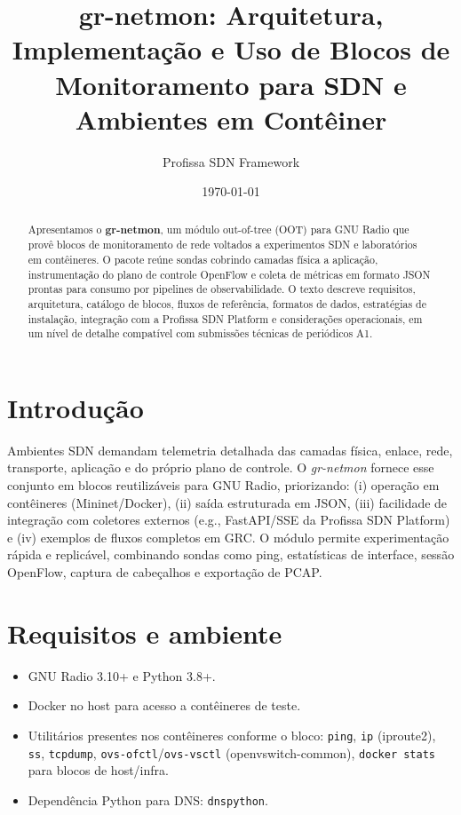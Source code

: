 \documentclass[11pt,a4paper]{article}
\title{gr-netmon: Arquitetura, Implementação e Uso de Blocos de Monitoramento para SDN e Ambientes em Contêiner}
\author{Profissa SDN Framework}
\date{\today}
\begin{document}
\maketitle

\begin{abstract}
Apresentamos o \textbf{gr-netmon}, um módulo out-of-tree (OOT) para GNU Radio que provê blocos de monitoramento de rede voltados a experimentos SDN e laboratórios em contêineres. O pacote reúne sondas cobrindo camadas física a aplicação, instrumentação do plano de controle OpenFlow e coleta de métricas em formato JSON prontas para consumo por pipelines de observabilidade. O texto descreve requisitos, arquitetura, catálogo de blocos, fluxos de referência, formatos de dados, estratégias de instalação, integração com a Profissa SDN Platform e considerações operacionais, em um nível de detalhe compatível com submissões técnicas de periódicos A1.
\end{abstract}

\section{Introdução}
Ambientes SDN demandam telemetria detalhada das camadas física, enlace, rede, transporte, aplicação e do próprio plano de controle. O \textit{gr-netmon} fornece esse conjunto em blocos reutilizáveis para GNU Radio, priorizando: (i) operação em contêineres (Mininet/Docker), (ii) saída estruturada em JSON, (iii) facilidade de integração com coletores externos (e.g., FastAPI/SSE da Profissa SDN Platform) e (iv) exemplos de fluxos completos em GRC. O módulo permite experimentação rápida e replicável, combinando sondas como ping, estatísticas de interface, sessão OpenFlow, captura de cabeçalhos e exportação de PCAP.

\section{Requisitos e ambiente}
\begin{itemize}[leftmargin=1.5em]
  \item GNU Radio 3.10+ e Python 3.8+.
  \item Docker no host para acesso a contêineres de teste.
  \item Utilitários presentes nos contêineres conforme o bloco: \texttt{ping}, \texttt{ip} (iproute2), \texttt{ss}, \texttt{tcpdump}, \texttt{ovs-ofctl}/\texttt{ovs-vsctl} (openvswitch-common), \texttt{docker stats} para blocos de host/infra.
  \item Dependência Python para DNS: \texttt{dnspython}.
\end{itemize}
\end{document}
